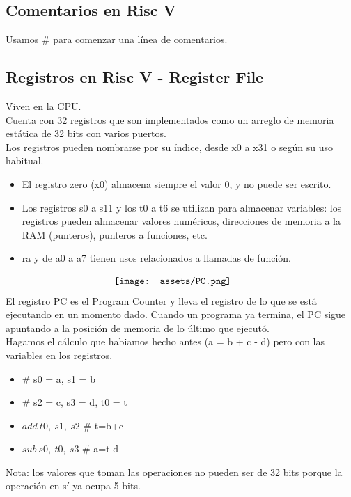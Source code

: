 \documentclass[10pt,a4paper]{article}
\begin{document}
\subsection*{Comentarios en Risc V}
Usamos \# para comenzar una línea de comentarios.
\subsection*{Registros en Risc V - Register File}
Viven en la CPU. \\ 
Cuenta con 32 registros que son implementados como un arreglo de memoria estática de 32 bits con varios puertos. \\
Los registros pueden nombrarse por su índice, desde x0 a x31 o según su uso habitual.
\begin{itemize}
    \item El registro zero (x0) almacena siempre el valor 0, y no puede ser escrito.
    \item Los registros s0 a s11 y los t0 a t6 se utilizan para almacenar variables: los registros pueden almacenar valores numéricos, direcciones de memoria a la RAM (punteros), punteros a funciones, etc.
    \item ra y de a0 a a7 tienen usos relacionados a llamadas de función.
\end{itemize}
\[\begin{minipage}[b]{0.4\textwidth}
    \texttt{[image: assets/PC.png]}
    \label{fig:PC}
\end{minipage}\]
El registro PC es el Program Counter y lleva el registro de lo que se está ejecutando en un momento dado. Cuando un programa ya termina, el PC sigue apuntando a la posición de memoria de lo último que ejecutó. \\
Hagamos el cálculo que habiamos hecho antes (a = b + c - d) pero con las variables en los registros.
\begin{itemize}
    \item \# s0 = a, s1 = b
    \item \# s2 = c, s3 = d, t0 = t
    \item \(add \ t0,\ s1,\ s2\) \# t=b+c
    \item \(sub \ s0,\ t0, \ s3\) \# a=t-d
\end{itemize}
Nota: los valores que toman las operaciones no pueden ser de 32 bits porque la operación en sí ya ocupa 5 bits. \\
\end{document}
